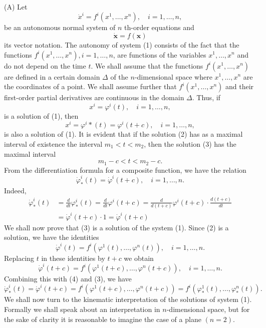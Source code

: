 \documentclass[10pt,a5paper]{book}
\theoremstyle{plain}
\theoremstyle{definition}
\theoremstyle{remark}
\begin{document}
(A) Let
\begin{equation*}
\dot{x}^{i}=f^{i}\left(x^{1}, \ldots, x^{n}\right), \quad i=1, \ldots, n, \tag{1}
\end{equation*}
be an autonomous normal system of $n$ th-order equations and
\[
\dot{\mathbf{x}}=f(\mathbf{x})
\]
its vector notation. The autonomy of system (1) consists of the fact that the functions $f^{i}\left(x^{1}, \ldots, x^{n}\right), i=1, \ldots, n$, are functions of the variables $x^{1}, \ldots, x^{n}$ and do not depend on the time $t$. We shall assume that the functions $f^{i}\left(x^{1}, \ldots, x^{n}\right)$ are defined in a certain domain $\Delta$ of the $n$-dimensional space where $x^{1}, \ldots, x^{n}$ are the coordinates of a point. We shall assume further that $f^{i}\left(x^{1}, \ldots, x^{n}\right)$ and their first-order partial derivatives are continuous in the domain $\Delta$. Thus, if
\begin{equation*}
x^{i}=\varphi^{i}(t), \quad i=1, \ldots, n, \tag{2}
\end{equation*}
is a solution of (1), then
\begin{equation*}
x^{i}=\varphi^{i} *(t)=\varphi^{i}(t+c), \quad i=1, \ldots, n, \tag{3}
\end{equation*}
is also a solution of (1). It is evident that if the solution (2) has as a maximal interval of existence the interval $m_{1}<t<m_{2}$, then the solution (3) has the maximal interval
\[
m_{1}-c<t<m_{2}-c .
\]
From the differentiation formula for a composite function, we have the relation
\begin{equation*}
\dot{\varphi}_{*}^{i}(t)=\dot{\varphi}^{i}(t+c), \quad i=1, \ldots, n . \tag{4}
\end{equation*}
Indeed,
\[
\begin{aligned}
\dot{\varphi}_{*}^{i}(t) & =\frac{d}{d t} \varphi_{*}^{i}(t)=\frac{d}{d t} \varphi^{i}(t+c)=\frac{d}{d(t+c)} \varphi^{i}(t+c) \cdot \frac{d(t+c)}{d t} \\
& =\dot{\varphi}^{i}(t+c) \cdot 1=\dot{\varphi}^{i}(t+c)
\end{aligned}
\]
We shall now prove that (3) is a solution of the system (1). Since (2) is a solution, we have the identities
\[
\dot{\varphi}^{i}(t)=f^{i}\left(\varphi^{1}(t), \ldots, \varphi^{n}(t)\right), \quad i=1, \ldots, n .
\]
Replacing $t$ in these identities by $t+c$ we obtain
\[
\dot{\varphi}^{i}(t+c)=f^{i}\left(\varphi^{1}(t+c), \ldots, \varphi^{n}(t+c)\right), \quad i=1, \ldots, n .
\]
Combining this with (4) and (3), we have
\[
\dot{\varphi}_{*}^{i}(t)=\dot{\varphi}^{i}(t+c)=f^{i}\left(\varphi^{1}(t+c), \ldots, \varphi^{n}(t+c)\right)=f^{i}\left(\varphi_{*}^{1}(t), \ldots, \varphi_{*}^{n}(t)\right) .
\]
We shall now turn to the kinematic interpretation of the solutions of system (1). Formally we shall speak about an interpretation in $n$-dimensional space, but for the sake of clarity it is reasonable to imagine the case of a plane $(n=2)$.
\end{document}
